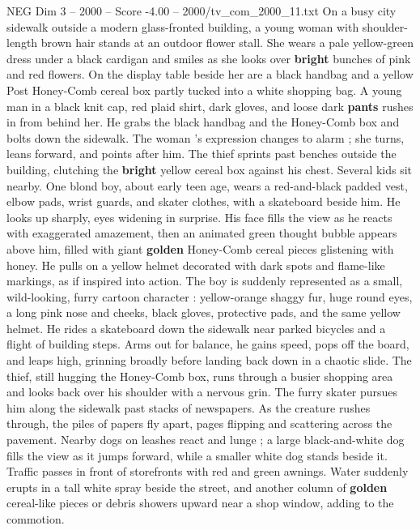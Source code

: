 \begin{textsample}{NEG Dim 3 – 2000 – Score -4.00 – 2000/tv\_com\_2000\_11.txt}  \label{ex:f3_neg_031}
On a busy city sidewalk outside a modern glass-fronted building, a young woman with shoulder-length brown hair stands at an outdoor flower stall.
She wears a pale yellow-green dress under a black cardigan and smiles as she looks over \textbf{bright} bunches of pink and red flowers.
On the display table beside her are a black handbag and a yellow Post Honey-Comb cereal box partly tucked into a white shopping bag.
A young man in a black knit cap, red plaid shirt, dark gloves, and loose dark \textbf{pants} rushes in from behind her.
He grabs the black handbag and the Honey-Comb box and bolts down the sidewalk.
The woman ’s expression changes to alarm ; she turns, leans forward, and points after him.
The thief sprints past benches outside the building, clutching the \textbf{bright} yellow cereal box against his chest.
Several kids sit nearby.
One blond boy, about early teen age, wears a red-and-black padded vest, elbow pads, wrist guards, and skater clothes, with a skateboard beside him.
He looks up sharply, eyes widening in surprise.
His face fills the view as he reacts with exaggerated amazement, then an animated green thought bubble appears above him, filled with giant \textbf{golden} Honey-Comb cereal pieces glistening with honey.
He pulls on a yellow helmet decorated with dark spots and flame-like markings, as if inspired into action.
The boy is suddenly represented as a small, wild-looking, furry cartoon character : yellow-orange shaggy fur, huge round eyes, a long pink nose and cheeks, black gloves, protective pads, and the same yellow helmet.
He rides a skateboard down the sidewalk near parked bicycles and a flight of building steps.
Arms out for balance, he gains speed, pops off the board, and leaps high, grinning broadly before landing back down in a chaotic slide.
The thief, still hugging the Honey-Comb box, runs through a busier shopping area and looks back over his shoulder with a nervous grin.
The furry skater pursues him along the sidewalk past stacks of newspapers.
As the creature rushes through, the piles of papers fly apart, pages flipping and scattering across the pavement.
Nearby dogs on leashes react and lunge ; a large black-and-white dog fills the view as it jumps forward, while a smaller white dog stands beside it.
Traffic passes in front of storefronts with red and green awnings.
Water suddenly erupts in a tall white spray beside the street, and another column of \textbf{golden} cereal-like pieces or debris showers upward near a shop window, adding to the commotion.

\end{textsample}
